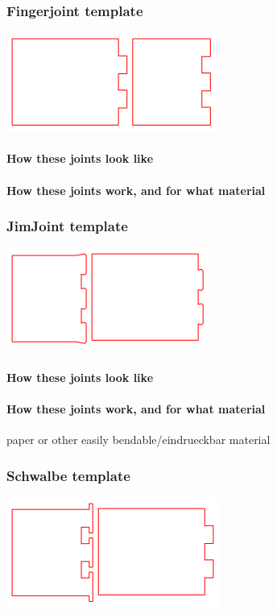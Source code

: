 \documentclass[../ClassicThesis.tex]{subfiles}
\begin{document}
\subsubsection{Fingerjoint template}
\includegraphics[width=0.5\columnwidth]{Images/fingerjoints.png}
\paragraph{How these joints look like}
\paragraph{How these joints work, and for what material}

\subsubsection{JimJoint template}
\includegraphics[width=0.5\columnwidth]{Images/jimjoints.png}
\paragraph{How these joints look like}
\paragraph{How these joints work, and for what material}
paper or other easily bendable/eindrueckbar material

\subsubsection{Schwalbe template}
\includegraphics[width=0.5\columnwidth]{Images/schwalbe.png}
\end{document}
